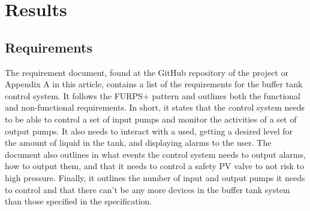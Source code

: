 \documentclass[11pt, A4paper, english]{article}
\begin{document}
	\section{Results}
		\subsection{Requirements}
The requirement document, found at the GitHub repository of the project \cite{github} or Appendix A in this article, contains a list of the requirements for the buffer tank control system. It follows the FURPS+ pattern and outlines both the functional and non-functional requirements. In short, it states that the control system needs to be able to control a set of input pumps and monitor the activities of a set of output pumps. It also needs to interact with a used, getting a desired level for the amount of liquid in the tank, and displaying alarms to the user. The document also outlines in what events the control system needs to output alarms, how to output them, and that it needs to control a safety PV valve to not risk to high pressure. Finally, it outlines the number of input and output pumps it needs to control and that there can't be any more devices in the buffer tank system than those specified in the specification.
\end{document}
